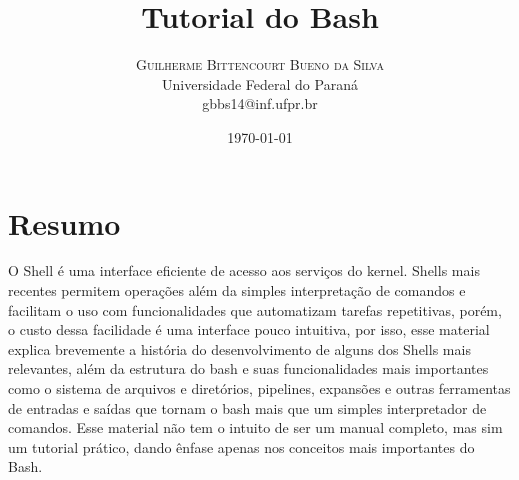 \documentclass[oneside, 11 pt]{article}
\title{Tutorial do Bash} %
\author{%
	\textsc{Guilherme Bittencourt Bueno da Silva} \\[1ex] %
	\normalsize Universidade Federal do Paraná \\ %
	\normalsize {gbbs14@inf.ufpr.br} %
}
\date{\today} %
\begin{document}
	
	\maketitle
	
	\tableofcontents
	
	\section{Resumo}
	O Shell é uma interface eficiente de acesso aos serviços do kernel. Shells mais recentes
	permitem operações além da simples interpretação de comandos e facilitam o uso com
	funcionalidades que automatizam tarefas repetitivas, porém, o custo dessa facilidade é uma
	interface pouco intuitiva, por isso, esse material explica brevemente a história do desenvolvimento de alguns dos Shells mais relevantes, além da estrutura do bash e suas funcionalidades mais importantes como o sistema de arquivos e diretórios, pipelines, expansões e outras ferramentas de entradas e saídas que tornam o bash mais que um simples interpretador de comandos. Esse material não tem o intuito de ser um manual completo, mas sim um tutorial prático, dando ênfase apenas nos conceitos mais importantes do Bash.
	
\end{document}
